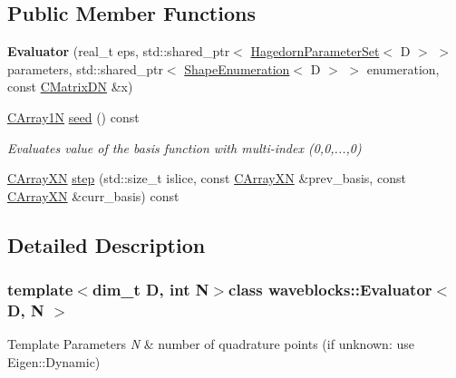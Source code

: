 \subsection*{Public Member Functions}
\begin{DoxyCompactItemize}
\item 
\hypertarget{classwaveblocks_1_1_evaluator_a2995a06e1a3e9ee459f2ed2186044933}{}{\bfseries Evaluator} (real\+\_\+t eps, std\+::shared\+\_\+ptr$<$ \hyperlink{structwaveblocks_1_1_hagedorn_parameter_set}{Hagedorn\+Parameter\+Set}$<$ D $>$ $>$ parameters, std\+::shared\+\_\+ptr$<$ \hyperlink{classwaveblocks_1_1_shape_enumeration}{Shape\+Enumeration}$<$ D $>$ $>$ enumeration, const \hyperlink{classwaveblocks_1_1_evaluator_ac9f759ecd07665903ed76d82ac68dc9a}{C\+Matrix\+D\+N} \&x)\label{classwaveblocks_1_1_evaluator_a2995a06e1a3e9ee459f2ed2186044933}

\item 
\hyperlink{classwaveblocks_1_1_evaluator_a49231d0afba65ca701dfdfb9f3c44c14}{C\+Array1\+N} \hyperlink{classwaveblocks_1_1_evaluator_a54a68a67c04f3c30e41687572e73998b}{seed} () const 
\begin{DoxyCompactList}\small\item\em Evaluates value of the basis function with multi-\/index (0,0,...,0) \end{DoxyCompactList}\item 
\hyperlink{classwaveblocks_1_1_evaluator_ae67334d6256ba6054f452a15d36c4941}{C\+Array\+X\+N} \hyperlink{classwaveblocks_1_1_evaluator_ae5070ca7d51cc6a28d8e3eeba3d6ddaf}{step} (std\+::size\+\_\+t islice, const \hyperlink{classwaveblocks_1_1_evaluator_ae67334d6256ba6054f452a15d36c4941}{C\+Array\+X\+N} \&prev\+\_\+basis, const \hyperlink{classwaveblocks_1_1_evaluator_ae67334d6256ba6054f452a15d36c4941}{C\+Array\+X\+N} \&curr\+\_\+basis) const 
\end{DoxyCompactItemize}


\subsection{Detailed Description}
\subsubsection*{template$<$dim\+\_\+t D, int N$>$class waveblocks\+::\+Evaluator$<$ D, N $>$}


\begin{DoxyTemplParams}{Template Parameters}
{\em N} & number of quadrature points (if unknown\+: use Eigen\+::\+Dynamic) \\
\hline
\end{DoxyTemplParams}


